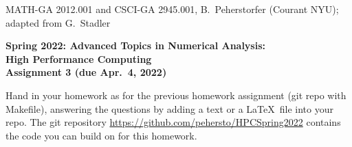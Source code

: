 \documentclass[12pt]{article}
\begin{document}
\begin{center}
  \vspace*{-2cm}
{\small MATH-GA 2012.001 and CSCI-GA 2945.001, B.~Peherstorfer (Courant NYU); adapted from G.~Stadler}\end{center}
\vspace*{.5cm}
\begin{center}
\large \textbf{%
Spring 2022: Advanced Topics in Numerical Analysis: \\
High Performance Computing \\
Assignment 3 (due Apr.\ 4, 2022) }
\end{center}



 Hand in your homework as for
the previous homework assignment (git repo with Makefile), answering
the questions by adding a text or a \LaTeX\ file into your repo.
The git repository \url{https://github.com/pehersto/HPCSpring2022}
contains the code you can build on for this homework.
\\[.2ex]
\end{document}
